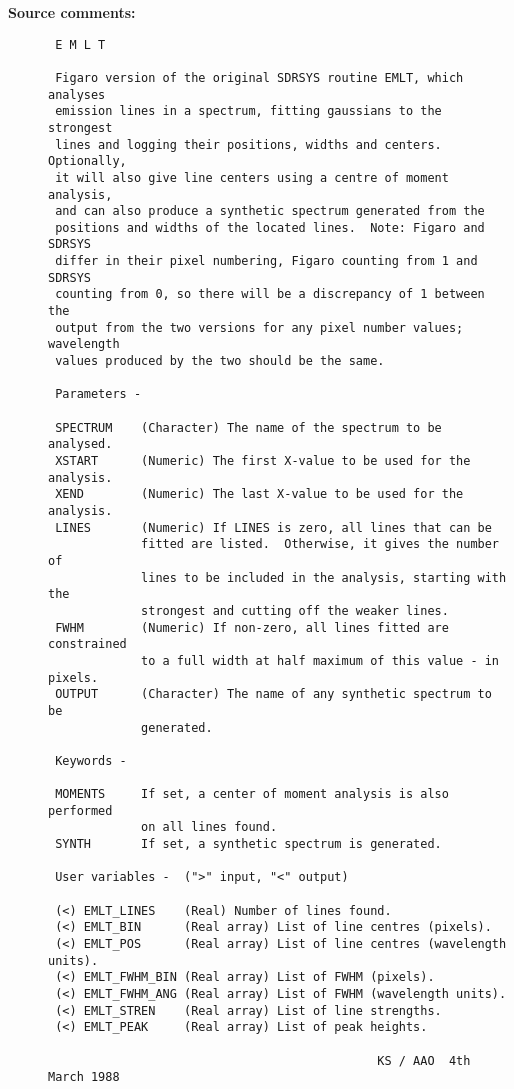\begin{description}
\item [{\bf Source comments:}]
\begin{verbatim}
 E M L T

 Figaro version of the original SDRSYS routine EMLT, which analyses
 emission lines in a spectrum, fitting gaussians to the strongest
 lines and logging their positions, widths and centers.  Optionally,
 it will also give line centers using a centre of moment analysis,
 and can also produce a synthetic spectrum generated from the
 positions and widths of the located lines.  Note: Figaro and SDRSYS
 differ in their pixel numbering, Figaro counting from 1 and SDRSYS
 counting from 0, so there will be a discrepancy of 1 between the
 output from the two versions for any pixel number values; wavelength
 values produced by the two should be the same.

 Parameters -

 SPECTRUM    (Character) The name of the spectrum to be analysed.
 XSTART      (Numeric) The first X-value to be used for the analysis.
 XEND        (Numeric) The last X-value to be used for the analysis.
 LINES       (Numeric) If LINES is zero, all lines that can be
             fitted are listed.  Otherwise, it gives the number of
             lines to be included in the analysis, starting with the
             strongest and cutting off the weaker lines.
 FWHM        (Numeric) If non-zero, all lines fitted are constrained
             to a full width at half maximum of this value - in pixels.
 OUTPUT      (Character) The name of any synthetic spectrum to be
             generated.

 Keywords -

 MOMENTS     If set, a center of moment analysis is also performed
             on all lines found.
 SYNTH       If set, a synthetic spectrum is generated.

 User variables -  (">" input, "<" output)

 (<) EMLT_LINES    (Real) Number of lines found.
 (<) EMLT_BIN      (Real array) List of line centres (pixels).
 (<) EMLT_POS      (Real array) List of line centres (wavelength units).
 (<) EMLT_FWHM_BIN (Real array) List of FWHM (pixels).
 (<) EMLT_FWHM_ANG (Real array) List of FWHM (wavelength units).
 (<) EMLT_STREN    (Real array) List of line strengths.
 (<) EMLT_PEAK     (Real array) List of peak heights.

                                              KS / AAO  4th March 1988
\end{verbatim}
\end{description}

